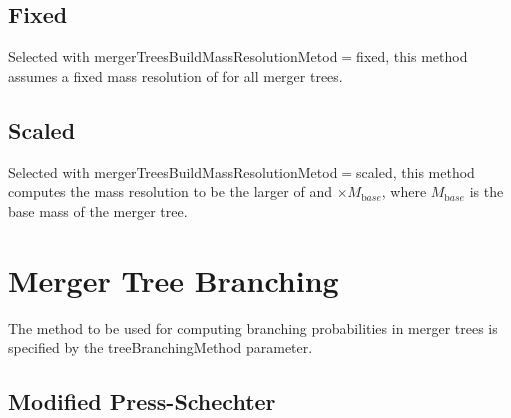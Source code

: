 \subsection{Fixed}\label{phys:mergerTreeMassResolution:mergerTreeMassResolutionFixed}

Selected with {\normalfont \ttfamily mergerTreesBuildMassResolutionMetod}$=${\normalfont \ttfamily fixed}, this method assumes a fixed mass resolution of {\normalfont \ttfamily [mergerTreeBuildMassResolutionFixed]} for all merger trees.

\subsection{Scaled}\label{phys:mergerTreeMassResolution:mergerTreeMassResolutionScaled}

Selected with {\normalfont \ttfamily mergerTreesBuildMassResolutionMetod}$=${\normalfont \ttfamily scaled}, this method computes the mass resolution to be the larger of {\normalfont \ttfamily [mergerTreeBuildMassResolutionScaledMinimum]} and {\normalfont \ttfamily [mergerTreeBuildMassResolutionScaledFraction]}$\times M_{\mathrm base}$, where $M_{\mathrm base}$ is the base mass of the merger tree.

\section{Merger Tree Branching}

The method to be used for computing branching probabilities in merger trees is specified by the {\normalfont \ttfamily treeBranchingMethod} parameter.

\subsection{Modified Press-Schechter}

